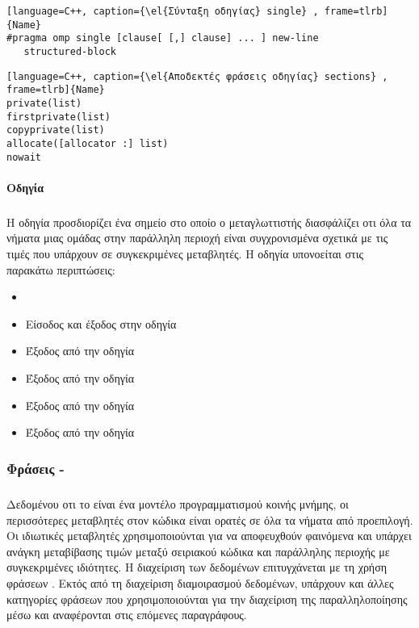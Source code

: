 \begin{lstlisting}[language=C++, caption={\el{Σύνταξη οδηγίας} single} , frame=tlrb]{Name} 
#pragma omp single [clause[ [,] clause] ... ] new-line 
   structured-block
\end{lstlisting}

\begin{lstlisting}[language=C++, caption={\el{Αποδεκτές φράσεις οδηγίας} sections} , frame=tlrb]{Name}
private(list) 
firstprivate(list) 
copyprivate(list) 
allocate([allocator :] list) 
nowait
\end{lstlisting}

\paragraph{Οδηγία \emph{}}
\subparagraph{}
Η οδηγία \emph{} προσδιορίζει ένα σημείο στο οποίο ο μεταγλωττιστής διασφάλίζει οτι όλα τα νήματα μιας ομάδας στην παράλληλη περιοχή είναι συγχρονισμένα σχετικά με τις τιμές που υπάρχουν σε συγκεκριμένες μεταβλητές.
Η οδηγία \emph{} υπονοείται στις παρακάτω περιπτώσεις\cite{ibm_flush}:
\begin{itemize}
\item{\emph{}}
\item{Είσοδος και έξοδος στην οδηγία \emph{}}
\item{Έξοδος από την οδηγία \emph{}}
\item{Έξοδος από την οδηγία \emph{}}
\item{Έξοδος από την οδηγία \emph{}}
\item{Έξοδος από την οδηγία \emph{}}
\end{itemize}

\subsubsection{Φράσεις - }
\subparagraph{}
Δεδομένου οτι το \emph{} είναι ένα μοντέλο προγραμματισμού κοινής μνήμης, οι περισσότερες μεταβλητές στον κώδικα \emph{} είναι ορατές σε όλα τα νήματα από προεπιλογή. Οι ιδιωτικές μεταβλητές χρησιμοποιούνται για να αποφευχθούν φαινόμενα  \emph{} και υπάρχει ανάγκη μεταβίβασης τιμών μεταξύ σειριακού κώδικα και παράλληλης περιοχής με συγκεκριμένες ιδιότητες. Η διαχείριση των δεδομένων επιτυγχάνεται με τη χρήση φράσεων \emph{}. 
Εκτός από τη διαχείριση διαμοιρασμού δεδομένων, υπάρχουν και άλλες κατηγορίες φράσεων που χρησιμοποιούνται για την διαχείριση της παραλληλοποίησης μέσω \emph{} και αναφέρονται στις επόμενες παραγράφους.

